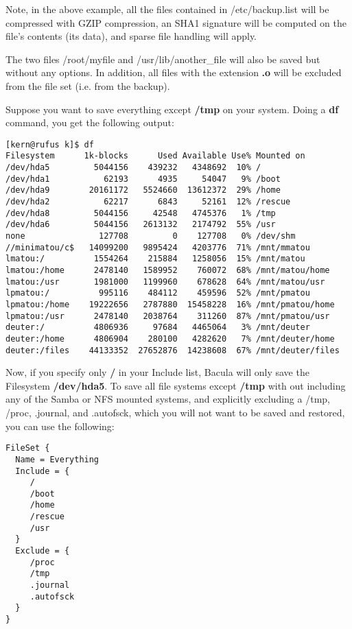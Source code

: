 Note, in the above example, all the files contained in /etc/backup.list will
be compressed with GZIP compression, an SHA1 signature will be computed on the
file's contents (its data), and sparse file handling will apply. 

The two files /root/myfile and /usr/lib/another\_file will also be saved but
without any options. In addition, all files with the extension {\bf .o} will
be excluded from the file set (i.e. from the backup). 

Suppose you want to save everything except {\bf /tmp} on your system. Doing a
{\bf df} command, you get the following output: 

\footnotesize
\begin{verbatim}
[kern@rufus k]$ df
Filesystem      1k-blocks      Used Available Use% Mounted on
/dev/hda5         5044156    439232   4348692  10% /
/dev/hda1           62193      4935     54047   9% /boot
/dev/hda9        20161172   5524660  13612372  29% /home
/dev/hda2           62217      6843     52161  12% /rescue
/dev/hda8         5044156     42548   4745376   1% /tmp
/dev/hda6         5044156   2613132   2174792  55% /usr
none               127708         0    127708   0% /dev/shm
//minimatou/c$   14099200   9895424   4203776  71% /mnt/mmatou
lmatou:/          1554264    215884   1258056  15% /mnt/matou
lmatou:/home      2478140   1589952    760072  68% /mnt/matou/home
lmatou:/usr       1981000   1199960    678628  64% /mnt/matou/usr
lpmatou:/          995116    484112    459596  52% /mnt/pmatou
lpmatou:/home    19222656   2787880  15458228  16% /mnt/pmatou/home
lpmatou:/usr      2478140   2038764    311260  87% /mnt/pmatou/usr
deuter:/          4806936     97684   4465064   3% /mnt/deuter
deuter:/home      4806904    280100   4282620   7% /mnt/deuter/home
deuter:/files    44133352  27652876  14238608  67% /mnt/deuter/files
\end{verbatim}
\normalsize

Now, if you specify only {\bf /} in your Include list, Bacula will only save
the Filesystem {\bf /dev/hda5}. To save all file systems except {\bf /tmp}
with out including any of the Samba or NFS mounted systems, and explicitly
excluding a /tmp, /proc, .journal, and .autofsck, which you will not want to
be saved and restored, you can use the following: 

\footnotesize
\begin{verbatim}
FileSet {
  Name = Everything
  Include = {
     /
     /boot
     /home
     /rescue
     /usr
  }
  Exclude = {
     /proc
     /tmp
     .journal
     .autofsck
  }
}
\end{verbatim}
\normalsize

